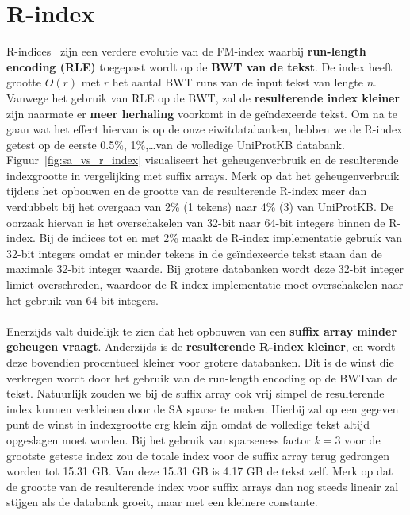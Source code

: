 \section{R-index}\label{sec:r-index}
R-indices~\cite{r_index1, r_index2} zijn een verdere evolutie van de FM-index waarbij \textbf{run-length encoding (RLE)} toegepast wordt op de \textbf{BWT van de tekst}.
De index heeft grootte $O(r)$ met $r$ het aantal BWT runs van de input tekst van lengte $n$.
Vanwege het gebruik van RLE op de BWT, zal de \textbf{resulterende index kleiner} zijn naarmate er \textbf{meer herhaling} voorkomt in de geïndexeerde tekst.
Om na te gaan wat het effect hiervan is op de onze eiwitdatabanken, hebben we de R-index getest op de eerste 0.5\%, 1\%,\ldots\space van de volledige UniProtKB databank.
Figuur~\ref{fig:sa_vs_r_index} visualiseert het geheugenverbruik en de resulterende indexgrootte in vergelijking met suffix arrays.
Merk op dat het geheugenverbruik tijdens het opbouwen en de grootte van de resulterende R-index meer dan verdubbelt bij het overgaan van 2\% (1 tekens) naar 4\% (3) van UniProtKB\@.
De oorzaak hiervan is het overschakelen van 32-bit naar 64-bit integers binnen de R-index.
Bij de indices tot en met 2\% maakt de R-index implementatie gebruik van 32-bit integers omdat er minder tekens in de geïndexeerde tekst staan dan de maximale 32-bit integer waarde.
Bij grotere databanken wordt deze 32-bit integer limiet overschreden, waardoor de R-index implementatie moet overschakelen naar het gebruik van 64-bit integers.
\\ \\
Enerzijds valt duidelijk te zien dat het opbouwen van een \textbf{suffix array minder geheugen vraagt}.
Anderzijds is de \textbf{resulterende R-index kleiner}, en wordt deze bovendien procentueel kleiner voor grotere databanken.
Dit is de winst die verkregen wordt door het gebruik van de run-length encoding op de BWT\@ van de tekst.
Natuurlijk zouden we bij de suffix array ook vrij simpel de resulterende index kunnen verkleinen door de SA sparse te maken.
Hierbij zal op een gegeven punt de winst in indexgrootte erg klein zijn omdat de volledige tekst altijd opgeslagen moet worden.
Bij het gebruik van sparseness factor $k = 3$ voor de grootste geteste index zou de totale index voor de suffix array terug gedrongen worden tot 15.31 GB\@.
Van deze 15.31 GB is 4.17 GB de tekst zelf.
Merk op dat de grootte van de resulterende index voor suffix arrays dan nog steeds lineair zal stijgen als de databank groeit, maar met een kleinere constante.

